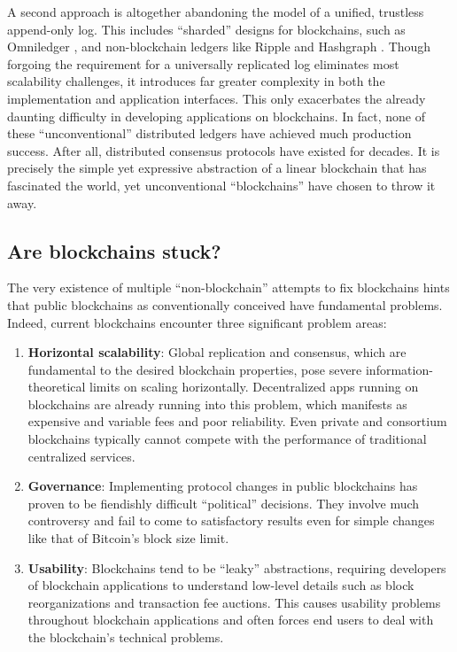 \documentclass[headinclude,12pt]{scrbook}
\begin{document}
A second approach is altogether abandoning the model of a unified, trustless append-only log. This includes ``sharded'' designs for blockchains, such as Omniledger \cite{kokoris2018omniledger}, and non-blockchain ledgers like Ripple \cite{armknecht2015ripple} and Hashgraph \cite{baird2016swirlds}. Though forgoing the requirement for a universally replicated log eliminates most scalability challenges, it introduces far greater complexity in both the implementation and application interfaces. This only exacerbates the already daunting difficulty in developing applications on blockchains. In fact, none of these ``unconventional'' distributed ledgers have achieved much production success. After all, distributed consensus protocols have existed for decades. It is precisely the simple yet expressive abstraction of a linear blockchain that has fascinated the world, yet unconventional ``blockchains'' have chosen to throw it away.

\subsection{Are blockchains stuck?}

The very existence of multiple ``non-blockchain'' attempts to fix blockchains hints that public blockchains as conventionally conceived have fundamental problems. Indeed, current blockchains encounter three significant problem areas:

\begin{enumerate}
    \item \textbf{Horizontal scalability}: Global replication and consensus, which are fundamental to the desired blockchain properties, pose severe information-theoretical limits on scaling horizontally. Decentralized apps running on blockchains are already running into this problem, which manifests as expensive and variable fees and poor reliability. Even private and consortium blockchains typically cannot compete with the performance of traditional centralized services.
    \item \textbf{Governance}: Implementing protocol changes in public blockchains has proven to be fiendishly difficult ``political'' decisions. They involve much controversy and fail to come to satisfactory results even for simple changes like that of Bitcoin's block size limit.
    \item \textbf{Usability}: Blockchains tend to be ``leaky'' abstractions, requiring developers of blockchain applications to understand low-level details such as block reorganizations and transaction fee auctions. This causes usability problems throughout blockchain applications and often forces end users to deal with the blockchain's technical problems.
\end{enumerate}
\end{document}
